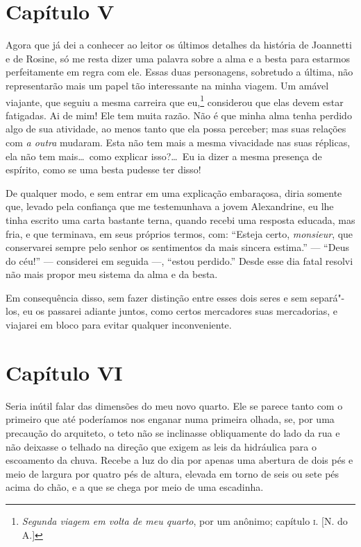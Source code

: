 \section*{Capítulo V}

 Agora que já dei a conhecer ao leitor os últimos detalhes da história
de Joannetti e de Rosine, só me resta dizer uma palavra sobre a alma e
a besta para estarmos perfeitamente em regra com ele. Essas duas
personagens, sobretudo a última, não representarão mais um papel tão
interessante na minha viagem. Um amável viajante, que seguiu a mesma
carreira que eu,\footnote{ \textit{Segunda viagem em volta de meu
quarto}, por um anônimo; capítulo \textsc{i}. [N. do A.]} considerou que elas devem
estar fatigadas. Ai de mim! Ele tem muita razão. Não é que minha alma
tenha perdido algo de sua atividade, ao menos tanto que ela possa
perceber; mas suas relações com \textit{a outra} mudaram. Esta não tem
mais a mesma vivacidade nas suas réplicas, ela não tem mais\ldots\ como
explicar isso?\ldots\ Eu ia dizer a mesma presença de espírito, como se uma
besta pudesse ter disso!

 De qualquer modo, e sem entrar em uma explicação embaraçosa, diria
somente que, levado pela confiança que me testemunhava a jovem
Alexandrine, eu lhe tinha escrito uma carta bastante terna, quando
recebi uma resposta educada, mas fria, e que terminava, em seus
próprios termos, com: ``Esteja certo, \textit{monsieur}, que conservarei
sempre pelo senhor os sentimentos da mais sincera estima.'' --- ``Deus do
céu!'' --- considerei em seguida ---, ``estou perdido.'' Desde esse dia fatal
resolvi não mais propor meu sistema da alma e da besta. 

 Em consequência disso, sem fazer distinção entre esses dois seres e sem
separá"-los, eu os passarei adiante juntos, como certos mercadores suas
mercadorias, e viajarei em bloco para evitar qualquer inconveniente. 

\section*{Capítulo VI}

 Seria inútil falar das dimensões do meu novo quarto. Ele se parece
tanto com o primeiro que até poderíamos nos enganar numa primeira olhada,                    %
se, por uma precaução do arquiteto, o teto não se inclinasse
obliquamente do lado da rua e não deixasse o telhado na direção que
exigem as leis da hidráulica para o escoamento da chuva. Recebe a luz
do dia por apenas uma abertura de dois pés e meio de largura por quatro
pés de altura, elevada em torno de seis ou sete pés acima do chão, e a
que se chega por meio de uma escadinha.

